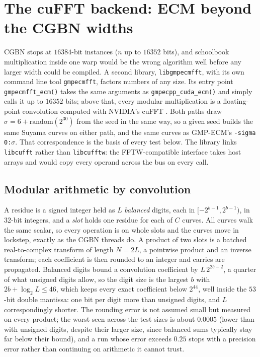 \documentclass[11pt,a4paper]{article}
\newcommand{\code}[1]{\texttt{#1}}
\begin{document}
\section{The cuFFT backend: ECM beyond the CGBN widths}
\label{sec:fft}

CGBN stops at $16384$-bit instances ($n$ up to $16352$ bits), and schoolbook multiplication
inside one warp would be the wrong algorithm well before any larger width could be compiled. A
second library, \code{libgmpecmfft}, with its own command line tool \code{gmpecmfft}, factors
numbers of any size. Its entry point \code{gmpecmfft\_ecm()} takes the same arguments as
\code{gmpecpp\_cuda\_ecm()} and simply calls it up to $16352$ bits; above that, every modular
multiplication is a floating-point convolution computed with NVIDIA's cuFFT \cite{cufft}. Both
paths draw $\sigma = 6 + \mathrm{random}(2^{30})$ from the seed in the same way, so a given seed
builds the same Suyama curves on either path, and the same curves as GMP-ECM's
\code{-sigma 0:}$\sigma$. That correspondence is the basis of every test below. The library links
\code{libcufft} rather than \code{libcufftw}: the FFTW-compatible interface takes host arrays and
would copy every operand across the bus on every call.

\subsection{Modular arithmetic by convolution}

A residue is a signed integer held as $L$ \emph{balanced} digits, each in
$[-2^{b-1}, 2^{b-1})$, in 32-bit integers, and a \emph{slot} holds one
residue for each of $C$ curves. All curves walk the same scalar, so every operation is on whole
slots and the curves move in lockstep, exactly as the CGBN threads do. A product of two slots is
a batched real-to-complex transform of length $N = 2L$, a pointwise product and an inverse
transform; each coefficient is then rounded to an integer and carries are propagated. Balanced
digits bound a convolution coefficient by $L\,2^{2b-2}$, a quarter of what unsigned digits
allow, so the digit size is the largest $b$ with $2b + \log_2 L \le 46$, which keeps every exact
coefficient below $2^{44}$, well inside the $53$-bit double mantissa: one bit per digit more than
unsigned digits, and $L$ correspondingly shorter. The rounding error is not assumed small but
measured on every product; the worst seen across the test sizes is about $0.0005$ (lower than
with unsigned digits, despite their larger size, since balanced sums typically stay far below
their bound), and a run whose error exceeds $0.25$ stops with a precision error rather than
continuing on arithmetic it cannot trust.
\end{document}
